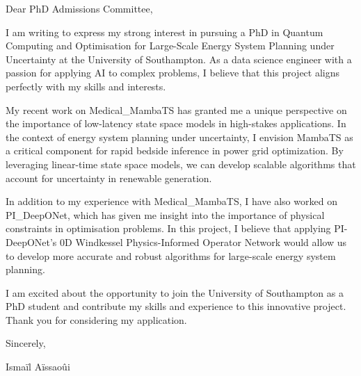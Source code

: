 \documentclass{letter}
\begin{document}
\opening{Dear PhD Admissions Committee,}

I am writing to express my strong interest in pursuing a PhD in Quantum Computing and Optimisation for Large-Scale Energy System Planning under Uncertainty at the University of Southampton. As a data science engineer with a passion for applying AI to complex problems, I believe that this project aligns perfectly with my skills and interests.

My recent work on Medical_MambaTS has granted me a unique perspective on the importance of low-latency state space models in high-stakes applications. In the context of energy system planning under uncertainty, I envision MambaTS as a critical component for rapid bedside inference in power grid optimization. By leveraging linear-time state space models, we can develop scalable algorithms that account for uncertainty in renewable generation.

In addition to my experience with Medical_MambaTS, I have also worked on PI_DeepONet, which has given me insight into the importance of physical constraints in optimisation problems. In this project, I believe that applying PI-DeepONet's 0D Windkessel Physics-Informed Operator Network would allow us to develop more accurate and robust algorithms for large-scale energy system planning.

I am excited about the opportunity to join the University of Southampton as a PhD student and contribute my skills and experience to this innovative project. Thank you for considering my application.

\closing{Sincerely,}

Ismaïl Aïssaoûi
\end{document}

